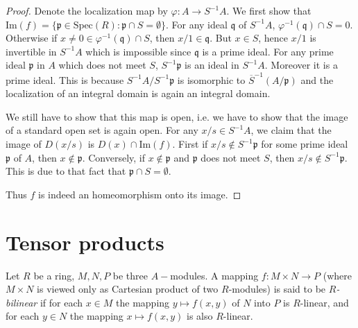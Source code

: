 \begin{proof}
Denote the localization map by $\varphi : A\rightarrow S^{-1}A$. We first
show that
$\text{Im}(f) = \{ \mathfrak p\in \text{Spec}(R):
\mathfrak p\cap S = \emptyset \}$. For any
ideal
$\mathfrak q$ of $S^{-1}A$, $\varphi^{-1}(\mathfrak q)\cap S = {0}$.
Otherwise if $x\not = 0\in\varphi^{-1}(\mathfrak q)\cap S$, then
$x/1\in \mathfrak q$. But $x\in S$, hence $x/1$ is invertible in
$S^{-1}A$ which is impossible since $\mathfrak q$ is a prime ideal.
For any prime ideal $\mathfrak p$ in
$A$ which does not meet $S$, $S^{-1}\mathfrak p$ is an ideal in $S^{-1}A$.
Moreover it is a prime ideal. This is because $S^{-1}A/S^{-1}\mathfrak p$ is
isomorphic to $\overline{S}^{-1}(A/\mathfrak p)$ and the localization of an
integral domain is again an integral domain.

\medskip\noindent
We still have to show that this map is open, i.e. we have to show
that the image of a standard open set is again open. For any
$x/s\in S^{-1}A$, we claim that the image of $D(x/s)$ is
$D(x)\cap\text{Im}(f)$.
First if $x/s\not\in S^{-1}\mathfrak p$ for some prime
ideal $\mathfrak p$ of $A$, then $x\not\in\mathfrak p$.
Conversely, if $x\not\in\mathfrak p$
and $\mathfrak p$ does not meet $S$, then
$x/s\not\in S^{-1}\mathfrak p$. This is
due to that fact that $\mathfrak p\cap S = \emptyset$.

\medskip\noindent
Thus $f$ is indeed an homeomorphism onto its image.
\end{proof}


























\section{Tensor products}
\label{section-tensor-product}

\begin{definition}
\label{definition-bilinear}
Let $R$ be a ring, $M, N, P$ be three $A-$modules.
A mapping $f : M \times N\rightarrow P$ (where $M\times N$
is viewed only as Cartesian product of two $R$-modules) is said to be
{\it $R$-bilinear} if for each $x \in M$
the mapping $y\mapsto f(x, y)$ of $N$ into $P$ is $R$-linear, and for each
$y\in N$ the mapping $x\mapsto f(x, y)$ is also $R$-linear.
\end{definition}

